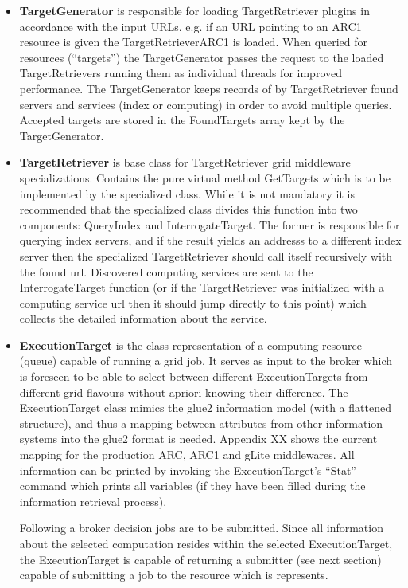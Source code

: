 \documentclass{book}
\begin{document}
\begin{itemize}
\item{{\bf TargetGenerator} is responsible for loading TargetRetriever plugins in accordance with the input URLs. 
e.g. if an URL pointing to an ARC1 resource is given the TargetRetrieverARC1 is loaded. When queried for resources 
(``targets'') the TargetGenerator passes the request to the loaded TargetRetrievers running them as individual threads 
for improved performance. The TargetGenerator keeps records of by TargetRetriever found servers and services 
(index or computing) in order to avoid multiple queries. Accepted targets are stored in the FoundTargets array kept by 
the TargetGenerator.}

\item{{\bf TargetRetriever} is base class for TargetRetriever grid middleware specializations. Contains the pure 
virtual method GetTargets which is to be implemented by the specialized class. While it is not mandatory it is recommended 
that the specialized class divides this function into two components: QueryIndex and InterrogateTarget. The former is 
responsible for querying index servers, and if the result yields an addresss to a different index server then the 
specialized TargetRetriever should call itself recursively with the found url. Discovered computing services are sent 
to the InterrogateTarget function (or if the TargetRetriever was initialized with a computing service url then it should 
jump directly to this point) which collects the detailed information about the service.}

\item{{\bf ExecutionTarget} is the class representation of a computing resource (queue) capable of running a grid job. It
serves as input to the broker which is foreseen to be able to select between different ExecutionTargets from different 
grid flavours without apriori knowing their difference. The ExecutionTarget class mimics the glue2 information model (with 
a flattened structure), and thus a mapping between attributes from other information systems into the glue2 format is needed. 
Appendix XX shows the current mapping for the production ARC, ARC1 and gLite middlewares. All information can be printed by 
invoking the ExecutionTarget's ``Stat'' command which prints all variables (if they have been filled during the information 
retrieval process).

Following a broker decision jobs are to be submitted. Since all information about the selected computation resides within the 
selected ExecutionTarget, the ExecutionTarget is capable of returning a submitter (see next section) capable of submitting a 
job to the resource which is represents.}
\end{itemize}
\end{document}
